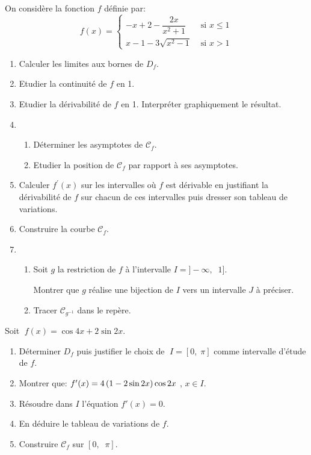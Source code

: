 \begin{exercice}
  On considère  la fonction $ f $ définie par:
    $$f(x)=\begin{cases}  
-x+2-\dfrac{2x}{x^2+1} & \text{ si }  x \leq 1\\
x-1-3\sqrt{x^{2} -1 } & \text{ si }  x > 1  
\end{cases} $$ 
\begin{enumerate} 
\item Calculer les limites aux bornes de $ D_{f}$.
\item Etudier la continuité de $ f $ en 1.
\item Etudier la dérivabilité  de $ f $ en 1. Interpréter graphiquement le résultat.
\item
\begin{enumerate} 
\item Déterminer les  asymptotes de $ \mathcal{C}_f $.
\item Etudier la position de $ \mathcal{C}_f $ par rapport à ses asymptotes.
\end{enumerate}
\item Calculer $ f^{\prime}(x) $ sur les intervalles où $ f $ est dérivable en justifiant la dérivabilité de $ f $ sur chacun de ces intervalles  puis dresser son tableau de variations.
\item Construire la courbe $ \mathcal{C}_f $.
\item 
\begin{enumerate} 
\item Soit $ g $ la restriction de $ f $ à l'intervalle 
$ I = ]-\infty, \;\; 1] $.

 Montrer que $ g $ réalise une bijection de  $ I $ vers un intervalle  $ J $ à préciser.
 \item  Tracer $ \mathcal{C}_{g^{-1}}$ dans le repère.
\end{enumerate}
\end{enumerate}
 \end{exercice}

 \begin{exercice}

Soit  $\; f(x)=\cos 4x+ 2\sin 2x $. 
 \begin{enumerate}
 \item  Déterminer  $ D_f $ puis justifier le choix de $\; I= [0,\; \pi] $ comme intervalle  d'étude de $ f $.
 \item Montrer que: $ f^{\prime}(x)=4\left(1-2\sin 2x\right)\cos 2x$ , $ x\in I$.
 \item Résoudre dans  $ I$ l'équation $ f'(x)=0. $
 \item En déduire le tableau de variations  de $ f$.
 \item Construire $ \mathcal{C}_{f} $  sur \; $ [0,\;\; \pi] $.
 \end{enumerate}
    
\end{exercice}
 
